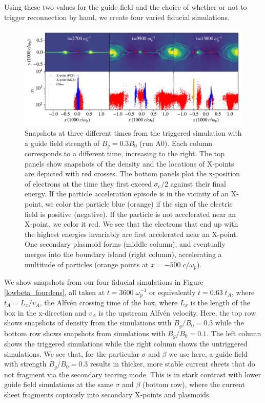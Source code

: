 Using these two values for the guide field and the choice of whether or not to trigger reconnection by hand, we create four varied fiducial simulations.  
\begin{figure}[t]
	{
		\includegraphics[width=\linewidth]{bguide3_accmec_singleplot.pdf}
		\caption{Snapshots at three different times from the triggered simulation with a guide field strength of $B_{g}=0.3B_{0}$ (run A0).  Each column corresponds to a different time, increasing to the right.  The top panels show snapshots of the density and the locations of X-points are depicted with red crosses.  The bottom panels plot the x-position of electrons at the time they first exceed $\sigma_{e}/2$ against their final energy.  If the particle acceleration episode is in the vicinity of an X-point, we color the particle blue (orange) if the sign of the electric field is positive (negative).  If the particle is not accelerated near an X-point, we color it red.  We see that the electrons that end up with the highest energies invariably are first accelerated near an X-point.  One secondary plasmoid forms (middle column), and eventually merges into the boundary island (right column), accelerating a multitude of particles (orange points at $x=-500 \; c/\omega_{p}$).
		}
		\label{triggered_bguide_snapshots}}
\end{figure}
We show snapshots from our four fiducial simulations in Figure \ref{lowbeta_fourdens}, all taken at $t=3600 \; \omega_{p}^{-1}$ or equivalently $t=0.63\; t_{A}$, where $t_{A}=L_{x}/v_{A}$, the Alfv\'en crossing time of the box, where $L_{x}$ is the length of the box in the x-direction and $v_{A}$ is the upstream Alfv\'en velocity.  Here, the top row shows snapshots of density from the simulations with $B_{g}/B_{0}=0.3$ while the bottom row shows snapshots from simulations with $B_{g}/B_{0}=0.1$.  The left column shows the triggered simulations while the right column shows the untriggered simulations.  We see that, for the particular $\sigma$ and $\beta$ we use here, a guide field with strength $B_{g}/B_{0}=0.3$ results in thicker, more stable current sheets that do not fragment via the secondary tearing mode.  This is in stark contrast with lower guide field simulations at the same $\sigma$ and $\beta$ (bottom row), where the current sheet fragments copiously into secondary X-points and plasmoids.

